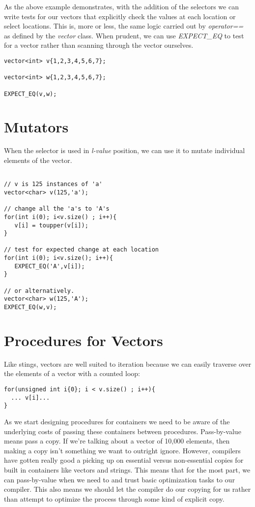 \documentclass[]{tufte-handout}
\begin{document}
As the above example demonstrates, with the addition of the selectors we can write tests for our vectors that explicitly check the values at each location or select locations. This is, more or less, the same logic carried out by \textit{operator==} as defined by the \textit{vector} class. When prudent, we can use \textit{EXPECT\_EQ} to test for a vector rather than scanning through the vector ourselves.
\begin{verbatim}
vector<int> v{1,2,3,4,5,6,7};

vector<int> w{1,2,3,4,5,6,7};

EXPECT_EQ(v,w);
\end{verbatim}

\section{Mutators} 	

When the selector is used in \textit{l-value} position, we can use it to mutate individual elements of the vector.
\begin{verbatim}

// v is 125 instances of 'a'
vector<char> v(125,'a');

// change all the 'a's to 'A's
for(int i(0); i<v.size() ; i++){
   v[i] = toupper(v[i]);
}

// test for expected change at each location
for(int i(0); i<v.size(); i++){
   EXPECT_EQ('A',v[i]);
}

// or alternatively. 
vector<char> w(125,'A');
EXPECT_EQ(w,v);

\end{verbatim}


\section{Procedures for Vectors}

Like stings, vectors are well suited to iteration because we can easily traverse over the elements of a vector with a counted loop: 
\begin{verbatim}
for(unsigned int i{0}; i < v.size() ; i++){
  ... v[i]...
}
\end{verbatim}

As we start designing procedures for containers we need to be aware of the underlying costs of passing these containers between procedures. Pass-by-value means pass a copy. If we're talking about a vector of 10,000 elements, then making a copy isn't something we want to outright ignore.  However, compilers have gotten really good a picking up on essential versus non-essential copies for built in containers like vectors and strings.  This means that for the most part, we can pass-by-value when we need to and trust basic optimization tasks to our compiler.  This also means we should let the compiler do our copying for us rather than attempt to optimize the process through some kind of explicit copy. 
\end{document}
